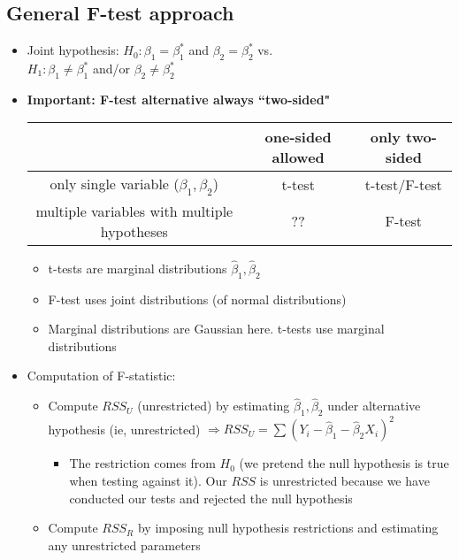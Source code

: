 \documentclass[10pt, oneside]{article}
\begin{document}
\subsection{General F-test approach}
\begin{itemize}
    \item Joint hypothesis: $H_0 : \beta_1 = \beta_1 ^*$ and $\beta_2 = \beta_2 ^*$ vs.\\ $H_1: \beta_1 \neq \beta_1 ^*$ and/or $\beta_2 \neq \beta_2^*$
    \item \textbf{Important: F-test alternative always ``two-sided"}\\
    \begin{tabular}{|c|c|c|}
        \hline
         & one-sided allowed & only two-sided \\
         \hline
         only single variable ($\beta_1, \beta_2$) & t-test & t-test/F-test \\
         \hline
         multiple variables with multiple hypotheses & ?? & F-test\\
         \hline
    \end{tabular}
    \begin{itemize}
        \item t-tests are marginal distributions $\hat \beta_1, \hat \beta_2$
        \item F-test uses joint distributions (of normal distributions)
        \item Marginal distributions are Gaussian here. t-tests use marginal distributions
    \end{itemize}
    \item Computation of F-statistic:
    \begin{itemize}
        \item Compute $RSS_U$ (unrestricted) by estimating $\hat \beta_1, \hat \beta_2$ under alternative hypothesis (ie, unrestricted) $\Rightarrow RSS_U = \sum (Y_i -\hat \beta_1 -\hat \beta_2 X_i )^2$
        \begin{itemize}
            \item The restriction comes from $H_0$ (we pretend the null hypothesis is true when testing against it). Our $RSS$ is unrestricted because we have conducted our tests and rejected the null hypothesis
        \end{itemize}
        \item Compute $RSS_R$ by imposing null hypothesis restrictions and estimating any unrestricted parameters
        \begin{itemize}

\end{itemize}
\end{itemize}
\end{itemize}
\end{document}
